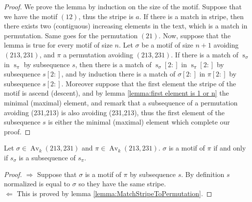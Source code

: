 \documentclass[a4paper]{llncs}
\DeclareMathOperator{\AV}{Av}
\newcommand{\ptext}{\pi}
\newcommand{\pmotif}{\sigma}
\DeclareMathOperator{\stripea}{s}
\newcommand{\stripe}[2]{\stripea_{{#1}}({#2})}
\newcommand{\stripew}[1]{\stripea_{{#1}}}
\newcommand{\ustep}{a}
\begin{document}
\begin{proof} 
We prove the lemma by induction on the size of the motif. Suppose that we have the motif $(12)$, thus the stripe is $\ustep$. If there is a match in stripe, then there exists two (contiguous) increasing elements in the text, which is a match in permutation. Same goes for the permutation $(21)$. Now, suppose that the lemma is true for every motif of size $n$. Let $\pmotif$ be a motif of size $n+1$ avoiding $(213,231)$, and $\ptext$ a permutation avoiding $(213,231)$. If there is a match of $\stripew{\pmotif}$ in $\stripew{\ptext}$ by subsequence $s$, then there is a match of $\stripew{\pmotif}[2:]$ in $\stripew{\ptext}[2:]$ by subsequence $s[2:]$, and by induction there is a match of $\pmotif[2:]$ in $\ptext[2:]$ by subsequence $s[2:]$. Moreover suppose that the first element the stripe of the motif is ascend (descent), and by lemma \ref{lemma:first element is 1 or n} the minimal (maximal) element, and remark that a subsequence of a permutation avoiding (231,213) is also avoiding (231,213), thus the first element of the subsequence $s$ is either the minimal (maximal) element which complete our proof.
\end{proof}	 

\begin{proposition}
Let $\sigma \in \AV_k(213,231)$ and $\pi \in \AV_k(213,231)$.
$\sigma$ is a motif of $\pi$ if and only if 
$s_\sigma$ is a subsequence of $s_\pi$.
\end{proposition}

		

\begin{proof}
$\Rightarrow$ Suppose that $\pmotif$ is a motif of $\ptext$ by subsequence $s$. By definition $s$ normalized is equal to
$\pmotif$ so they have the same stripe.\\ 
$\Leftarrow$ This is proved by lemma \ref{lemma:MatchStripeToPermutation}.
\end{proof}
	 		
\end{document}
